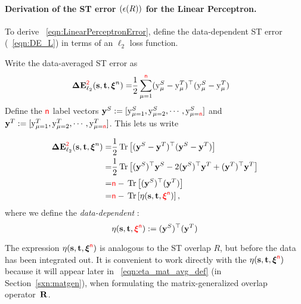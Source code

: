 \paragraph{Derivation of the ST error $(\epsilon(R))$ for the Linear Perceptron.}
To derive \EQN~\ref{eqn:LinearPerceptronError},
define the data-dependent ST error (\EQN~\ref{eqn:DE_L}) in terms of an $\ell_2$ loss function.

Write the data-averaged ST error as
\begin{align}
\nonumber
\mathbf{\Delta {E}}^{{\color{red}\sf{2}}}_{\ell_2}({\mathbf{s}},{\mathbf{t}}, \boldsymbol{\xi}^{n})= & \frac{1}{2} \sum_{\mu=1}^{{\color{red}\sf{n}}}(\mathrm{y}_{\mu}^{S} - \mathrm{y}_{\mu}^{T})^{\top} (\mathrm{y}_{\mu}^{S} - \mathrm{y}_{\mu}^{T})
\end{align}
Define the ${\color{red}\sf{n}}$ label vectors  
$\mathbf{y}^{S}:=[\mathrm{y}_{\mu=1}^{S}, \mathrm{y}_{\mu=2}^{S}, \cdots, \mathrm{y}_{\mu={\color{red}\sf{n}}}^{S}]$ and 
$\mathbf{y}^{T}:=[\mathrm{y}_{\mu=1}^{T}, \mathrm{y}_{\mu=2}^{T}, \cdots, \mathrm{y}_{\mu={\color{red}\sf{n}}}^{T}]$.
This lets us write 

\begin{align}
\nonumber
\DETOPSTLL= & \frac{1}{2} \Trace{(\YsVEC - \YtVEC)^{\top} (\YsVEC - \YtVEC)} \\
\nonumber
=& \frac{1}{2} \Trace{(\YsVEC)^{\top} \YsVEC - 2 (\YsVEC)^{\top} \YtVEC + (\YtVEC)^{\top} \YtVEC } \\
\nonumber
=& \ND - \Trace{(\YsVEC)^{\top} (\YtVEC)}\\
=& \ND- \Trace{\ETA(\SVEC,\TVEC,\red{\NDXI})},
\label{eqn:deriveSTerror}
\end{align}
where we define the \emph{data-dependent \SelfOverlap}:
\begin{equation}
\eta({\mathbf{s}},{\mathbf{t}},{\color{red}\sf{\boldsymbol{\xi}^{{\color{red}\sf{n}}}}}):=(\mathbf{y}^{S})^{\top}(\mathbf{y}^{T})
\end{equation}

The expression $\eta({\mathbf{s}},{\mathbf{t}},\boldsymbol{\xi}^{{\color{red}\sf{n}}})$ is analogous to the ST overlap $R$, but before the data has been integrated out.
It is convenient to work directly with
the \SelfOverlap $\eta({\mathbf{s}},{\mathbf{t}},\boldsymbol{\xi}^{{\color{red}\sf{n}}})$ because it will appear later in \EQN~\ref{eqn:eta_mat_avg_def} (in Section~\ref{sxn:matgen}), 
when formulating the matrix-generalized overlap operator~$\mathbf{R}$.

